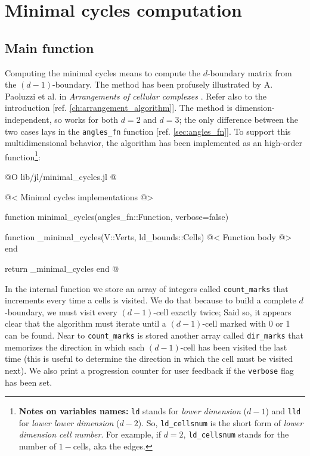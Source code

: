 \chapter{Minimal cycles computation}
\label{ch:minimal_cycles}

\section{Main function}


Computing the minimal cycles means to compute the $d$-boundary matrix
from the $(d-1)$-boundary. The method has been profusely illustrated
by A. Paoluzzi et al. in \textit{Arrangements of cellular complexes}
\cite{Paoluzzi}. Refer also to the introduction
[ref. \ref{ch:arrangement_algorithm}].
The method is dimension-independent, so works for both $d=2$ and $d=3$;
the only difference between the two cases lays in the \texttt{angles\_fn}
function [ref. \ref{sec:angles_fn}]. To support this multidimensional
behavior, the algorithm has been implemented as an high-order function\footnote{
    \textbf{Notes on variables names:} \texttt{ld} stands for \textit{lower dimension} ($d-1$)
    and \texttt{lld} for \textit{lower lower dimension} ($d-2$). So, \texttt{ld\_cellsnum} is the
    short form of \textit{lower dimension cell number}. For example, if $d=2$, \texttt{ld\_cellsnum} stands for the
    number of $1-$cells, aka the edges.
}:

@O lib/jl/minimal_cycles.jl
@{@< Minimal cycles implementations @>

function minimal_cycles(angles_fn::Function, verbose=false)

    function _minimal_cycles(V::Verts, ld_bounds::Cells)
        @< Function body @>
    end

    return _minimal_cycles
end
@}

In the internal function we store an array of integers called \texttt{count\_marks} 
that increments every time a cells is visited. We do that because to build 
a complete $d$-boundary, we must visit every $(d-1)$-cell exactly twice;
Said so, it appears clear that the algorithm must iterate until a $(d-1)$-cell 
marked with 0 or 1 can be found. Near to \texttt{count\_marks} is stored another
array called \texttt{dir\_marks} that memorizes the direction in which each $(d-1)$-cell
has been visited the last time (this is useful to determine the direction in which the cell
must be visited next). We also print a progression counter for user feedback 
if the \texttt{verbose} flag has been set.

